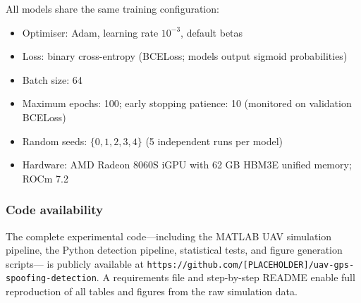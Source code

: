 All models share the same training configuration:
\begin{itemize}
  \item Optimiser: Adam, learning rate $10^{-3}$, default betas
  \item Loss: binary cross-entropy (BCELoss; models output sigmoid probabilities)
  \item Batch size: 64
  \item Maximum epochs: 100; early stopping patience: 10 (monitored on validation BCELoss)
  \item Random seeds: $\{0, 1, 2, 3, 4\}$ (5 independent runs per model)
  \item Hardware: AMD Radeon 8060S iGPU with 62 GB HBM3E unified memory; ROCm 7.2
\end{itemize}

\subsubsection{Code availability}

The complete experimental code---including the MATLAB UAV simulation pipeline,
the Python detection pipeline, statistical tests, and figure generation scripts---
is publicly available at
\texttt{https://github.com/[PLACEHOLDER]/uav-gps-spoofing-detection}.
A requirements file and step-by-step README enable full reproduction of all
tables and figures from the raw simulation data.
